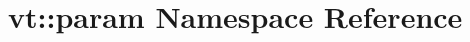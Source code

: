\hypertarget{namespacevt_1_1param}{}\section{vt\+:\+:param Namespace Reference}
\label{namespacevt_1_1param}
